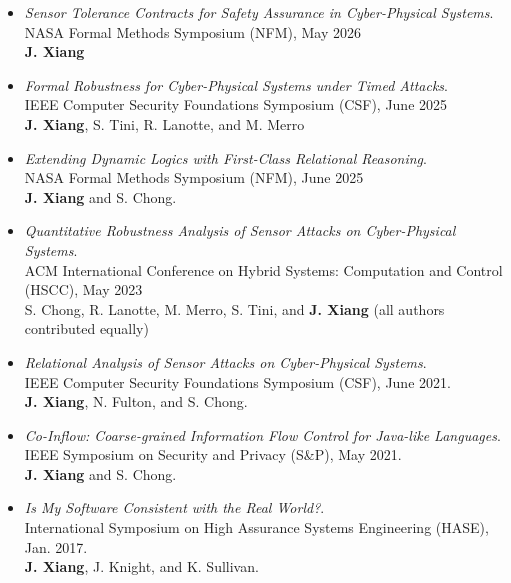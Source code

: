 \documentclass[11pt]{article}
\begin{document}
\begin{itemize}

  \item \textit{Sensor Tolerance Contracts for Safety Assurance in Cyber-Physical Systems}. \\
  NASA Formal Methods Symposium (NFM), May 2026 \\
  \textbf{J. Xiang}
  
  \item \textit{Formal Robustness for Cyber-Physical Systems under Timed Attacks}. \\
  IEEE Computer Security Foundations Symposium (CSF), June 2025 \\
  \textbf{J. Xiang}, S. Tini, R. Lanotte, and M. Merro

  \item \textit{Extending Dynamic Logics with First-Class Relational Reasoning}. \\
  NASA Formal Methods Symposium (NFM), June 2025 \\
  \textbf{J. Xiang} and S. Chong. 

  \item \textit{Quantitative Robustness Analysis of Sensor Attacks on Cyber-Physical Systems}. \\
  ACM International Conference on Hybrid Systems: Computation and Control (HSCC), May 2023 \\
  S. Chong, R. Lanotte, M. Merro, S. Tini, and \textbf{J. Xiang}
  (all authors contributed equally)

  \item \textit{Relational Analysis of Sensor Attacks on Cyber-Physical Systems}. %
  \\
  IEEE Computer Security Foundations Symposium (CSF),  June 2021. \\
  \textbf{J. Xiang}, N. Fulton, and S. Chong. 
  
\item \textit{Co-Inflow: Coarse-grained Information Flow Control for Java-like Languages}. %
\\
  IEEE Symposium on Security and Privacy (S\&P), May 2021.  \\
  \textbf{J. Xiang} and S. Chong.
  
\item \textit{Is My Software Consistent with the Real World?}. 
\\
  International Symposium on High Assurance Systems Engineering (HASE), Jan. 2017.  \\
  \textbf{J. Xiang}, J. Knight, and K. Sullivan.


\end{itemize}
\end{document}
